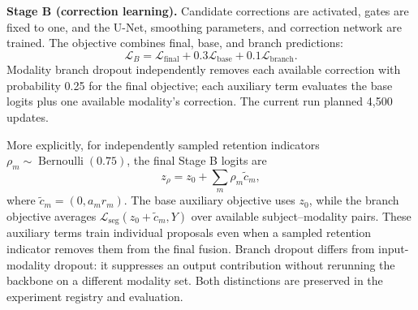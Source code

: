 \documentclass[conference]{IEEEtran}
\begin{document}
\textbf{Stage B (correction learning).} Candidate corrections are activated, gates are fixed to one, and the U-Net, smoothing parameters, and correction network are trained. The objective combines final, base, and branch predictions:
\begin{equation}
\mathcal L_B=\mathcal L_{\mathrm{final}}
+0.3\mathcal L_{\mathrm{base}}+0.1\mathcal L_{\mathrm{branch}}.
\label{eq:stageb}
\end{equation}
Modality branch dropout independently removes each available correction with probability 0.25 for the final objective; each auxiliary term evaluates the base logits plus one available modality's correction. The current run planned 4,500 updates.

More explicitly, for independently sampled retention indicators $\rho_m\sim\operatorname{Bernoulli}(0.75)$, the final Stage B logits are
\begin{equation}
z_{\rho}=z_0+\sum_m\rho_m\tilde c_m,
\label{eq:dropout}
\end{equation}
where $\tilde c_m=(0,a_mr_m)$. The base auxiliary objective uses $z_0$, while the branch objective averages $\mathcal L_{\mathrm{seg}}(z_0+\tilde c_m,Y)$ over available subject--modality pairs. These auxiliary terms train individual proposals even when a sampled retention indicator removes them from the final fusion. Branch dropout differs from input-modality dropout: it suppresses an output contribution without rerunning the backbone on a different modality set. Both distinctions are preserved in the experiment registry and evaluation.
\end{document}
